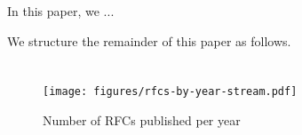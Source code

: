 \documentclass[twocolumn,10pt]{article}
\begin{document}




In this paper, we ...





We structure the remainder of this paper as follows.

\section{}


\begin{figure}
  \centering
  \texttt{[image: figures/rfcs-by-year-stream.pdf]}
  \caption{Number of RFCs published per year}
  \label{fig:rfcs-by-year}
\end{figure}


\section{}
\end{document}

